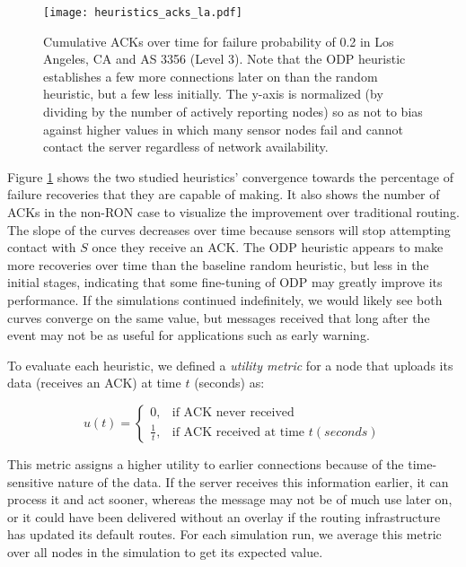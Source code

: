 \documentclass[conference]{IEEEtran}
\begin{document}
\begin{figure}
\centering
\texttt{[image: heuristics\_acks\_la.pdf]}
\caption{Cumulative ACKs over time for failure probability of 0.2 in Los Angeles, CA and AS 3356 (Level 3). Note that the ODP heuristic establishes a few more connections later on than the random heuristic, but a few less initially. The y-axis is normalized (by dividing by the number of actively reporting nodes) so as not to bias against higher \pfail values in which many sensor nodes fail and cannot contact the server regardless of network availability.} %
\label{fig_acks}
\end{figure}

Figure \ref{fig_acks} shows the two studied heuristics' convergence towards the percentage of failure recoveries that they are capable of making.
It also shows the number of ACKs in the non-RON case to visualize the improvement over traditional routing.
The slope of the curves decreases over time because sensors will stop attempting contact with $S$ once they receive an ACK.
The ODP heuristic appears to make more recoveries over time than the baseline random heuristic, but less in the initial stages, indicating that some fine-tuning of ODP may greatly improve its performance.
If the simulations continued indefinitely, we would likely see both curves converge on the same value, but messages received that long after the event may not be as useful for applications such as early warning.

To evaluate each heuristic, we defined a \emph{utility metric} for a node that uploads its data (receives an ACK) at time $t$ (seconds) as:

\begin{equation}
 \label{utility_metric}
 u(t) =
    \begin{cases}
      0, & \text{if ACK never received} \\
      \frac{1}{t}, & \text{if ACK received at time } t (seconds)
    \end{cases}
\end{equation}

This metric assigns a higher utility to earlier connections because of the time-sensitive nature of the data.
If the server receives this information earlier, it can process it and act sooner, whereas the message may not be of much use later on, or it could have been delivered without an overlay if the routing infrastructure has updated its default routes.
For each simulation run, we average this metric over all nodes in the simulation to get its expected value.
\end{document}
